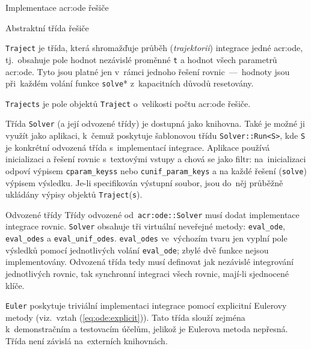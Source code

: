 \documentclass[thesis=M,czech]{FITthesis}[2012/06/26]
\newcommand{\acrlabel}[1]{acr:#1}
\newcommand{\acr}[1]{\acrshort{\acrlabel{#1}}}
\newcommand{\id}[1]{\texttt{#1}}
\newcommand{\hl}[1]{\textit{#1}}
\newcommand{\name}[1]{\hl{#1}}
\newcommand{\rf}[1]{\ref{#1}}
\newcommand{\rfeq}[1]{(\rf{eq:#1})}
\begin{document}
\begin{section}{Implementace \acr{ode} řešiče}
\begin{subsection}{Abstraktní třída řešiče}

\begin{paragraph}{\id{Traject}}\label{p:impl:ode:solver:op:traj}
je třída, která shromažďuje průběh (\name{trajektorii})
integrace jedné \acr{ode},
tj.~obsahuje pole hodnot nezávislé proměnné \id{t}
a hodnot všech parametrů \acr{ode}.
Tyto jsou platné jen v~rámci jednoho
řešení rovnic~---~hodnoty jsou při~každém volání funkce \id{solve}*
z~kapacitních důvodů resetovány.

\id{Trajects} je pole objektů \id{Traject} o~velikosti
počtu \acr{ode} řešiče.
\end{paragraph} %



\bigskip

Třída \id{Solver} (a její odvozené třídy) je dostupná jako knihovna.
Také je možné ji využít jako aplikaci,
k~čemuž poskytuje šablonovou třídu \id{Solver::\-Run<S>},
kde \id{S} je konkrétní odvozená třída s~implementací integrace.
Aplikace používá inicializaci a řešení rovnic
s~textovými vstupy a chová se jako filtr:
na~inicializaci odpoví výpisem
\id{cparam\_\-keyss} nebo \id{cunif\_\-param\_\-keys}
a na každé řešení (\id{solve}) výpisem výsledku.
Je-li specifikován výstupní soubor,
jsou do~něj průběžně ukládány
výpisy objektů \id{Traject}(\id{s}).
\end{subsection} %


\begin{subsection}{Odvozené třídy}
\label{ss:impl:ode:derived}
Třídy odvozené od~\id{\acr{ode}::\-Solver}
musí dodat implementace integrace rovnic.
\id{Solver} obsahuje tři virtuální neveřejné metody:
\id{eval\_\-ode}, \id{eval\_\-odes}
a \id{eval\_\-unif\_\-odes}.
\id{eval\_\-odes} ve~výchozím tvaru
jen vyplní pole výsledků pomocí
jednotlivých volání \id{eval\_\-ode};
zbylé dvě funkce nejsou implementovány.
Odvozená třída tedy musí definovat
jak nezávislé integrování jednotlivých rovnic,
tak synchronní integraci všech rovnic,
mají-li sjednocené klíče.


\begin{paragraph}{\id{Euler}}
\label{p:impl:ode:derived:euler}
poskytuje triviální implementaci integrace
pomocí explicitní Eulerovy metody
(viz.~vztah \rfeq{ode:explicit}).
Tato třída slouží zejména k~demonstračním a testovacím účelům,
jelikož je Eulerova metoda nepřesná.
Třída není závislá na~externích knihovnách.


\end{paragraph}
\end{subsection}
\end{section}
\end{document}
